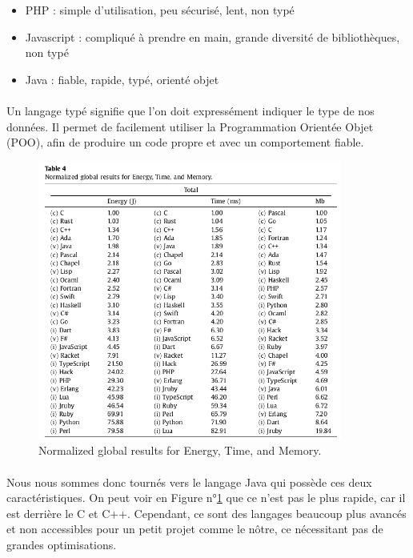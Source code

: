 \documentclass[a4paper, 12pt]{article}
\begin{document}
\begin{itemize}
	\item PHP : simple d’utilisation, peu sécurisé, lent, non typé
	\item Javascript : compliqué à prendre en main, grande diversité de bibliothèques, non typé
	\item Java : fiable, rapide, typé, orienté objet
\end{itemize}

\paragraph{}Un langage typé signifie que l’on doit expressément indiquer le type de nos données. Il permet de facilement utiliser la Programmation Orientée Objet (POO), afin de produire un code propre et avec un comportement fiable. 

\begin{figure}[H]
	\begin{center}
		\includegraphics[width=10cm]{fig/tableLang}
		\caption{Normalized global results for Energy, Time, and Memory.\cite{pereira_ranking_2021}}
		\label{fig:tableLang}
	\end{center}
\end{figure}

\paragraph{}Nous nous sommes donc tournés vers le langage Java qui possède ces deux caractéristiques. On peut voir en Figure n°\ref{fig:tableLang} que ce n’est pas le plus rapide, car il est derrière le C et C++. Cependant, ce sont des langages beaucoup plus avancés et non accessibles pour un petit projet comme le nôtre, ce nécessitant pas de grandes optimisations.
\end{document}
